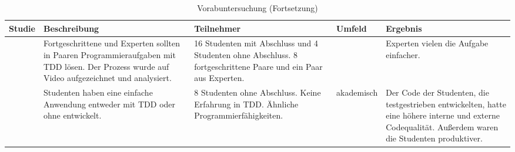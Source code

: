 \addtocounter{table}{-1}
\begin{table*}[p]
\renewcommand{\arraystretch}{1.3}
\caption{Vorabuntersuchung (Fortsetzung)}
\centering
\begin{tabularx}{\textwidth}{@{}Xp{}p{}p{}p{}@{}}
\toprule
Studie                                       & Beschreibung                                                                                                                                                                                                                             & Teilnehmer                                                                                                                                                     & Umfeld                    & Ergebnis                                                                                                                                                                                                                                                        \\ \midrule
\cite{Xu2007ProgrammersDevelopment}          & Fortgeschrittene und Experten sollten in Paaren Programmieraufgaben mit TDD lösen. Der Prozess wurde auf Video aufgezeichnet und analysiert.                                                                                             & 16 Studenten mit Abschluss und 4 Studenten ohne Abschluss. 8 fortgeschrittene Paare und ein Paar aus Experten.                                                     &                           & Experten vielen die Aufgabe einfacher.                                                                                                                                                                                                                          \\
\cite{Xu2009EvaluationStudy}                 & Studenten haben eine einfache Anwendung entweder mit TDD oder ohne entwickelt.                                                                                                                                                           & 8 Studenten ohne Abschluss. Keine Erfahrung in TDD. Ähnliche Programmierfähigkeiten.                                                                           & akademisch                & Der Code der Studenten, die testgestrieben entwickelten, hatte eine höhere interne und externe Codequalität. Außerdem waren die Studenten produktiver.                                                                                                          \\

\end{tabularx}
\end{table*}
